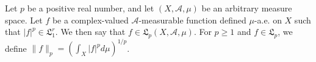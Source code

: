 Let $p$ be a positive real number, and let $(X, \mathcal{A}, \mu)$ be an arbitrary measure space. Let $f$ be a complex-valued $\mathcal{A}$-measurable function defined $\mu$-a.e. on $X$ such that $|f|^p \in \mathfrak{L}_1^r$. We then say that $f \in \mathfrak{L}_p(X, \mathcal{A}, \mu)$. For $p \geq 1$ and $f \in \mathfrak{L}_p$, we define $\|f\|_p = (\int_X |f|^p d\mu)^{1/p}$.
